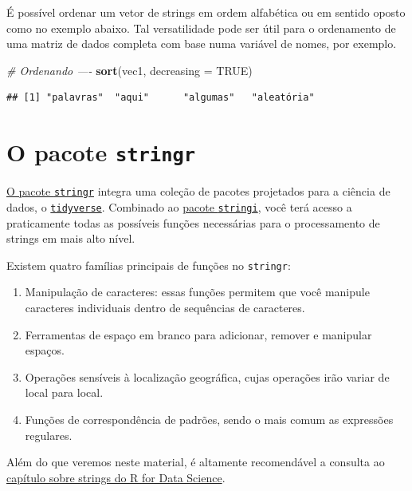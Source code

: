 \documentclass[]{book}
\newenvironment{Shaded}{\begin{snugshade}}{\end{snugshade}}
\newcommand{\CommentTok}[1]{\textcolor[rgb]{0.56,0.35,0.01}{\textit{#1}}}
\newcommand{\DataTypeTok}[1]{\textcolor[rgb]{0.13,0.29,0.53}{#1}}
\newcommand{\KeywordTok}[1]{\textcolor[rgb]{0.13,0.29,0.53}{\textbf{#1}}}
\newcommand{\NormalTok}[1]{#1}
\newcommand{\OtherTok}[1]{\textcolor[rgb]{0.56,0.35,0.01}{#1}}
\begin{document}
É possível ordenar um vetor de strings em ordem alfabética ou em sentido oposto como no exemplo abaixo. Tal versatilidade pode ser útil para o ordenamento de uma matriz de dados completa com base numa variável de nomes, por exemplo.

\begin{Shaded}
\begin{Highlighting}[]
\CommentTok{# Ordenando ----}
\KeywordTok{sort}\NormalTok{(vec1, }\DataTypeTok{decreasing =} \OtherTok{TRUE}\NormalTok{)}
\end{Highlighting}
\end{Shaded}

\begin{verbatim}
## [1] "palavras"  "aqui"      "algumas"   "aleatória"
\end{verbatim}

\hypertarget{o-pacote-stringr}{%
\section{\texorpdfstring{O pacote \texttt{stringr}}{O pacote stringr}}\label{o-pacote-stringr}}

\href{https://stringr.tidyverse.org/}{O pacote \texttt{stringr}} integra uma coleção de pacotes projetados para a ciência de dados, o \href{https://www.tidyverse.org/}{\texttt{tidyverse}}. Combinado ao \href{https://cran.r-project.org/web/packages/stringi/index.html}{pacote \texttt{stringi}}, você terá acesso a praticamente todas as possíveis funções necessárias para o processamento de strings em mais alto nível.

Existem quatro famílias principais de funções no \texttt{stringr}:

\begin{enumerate}
\def\labelenumi{\arabic{enumi}.}
\item
  Manipulação de caracteres: essas funções permitem que você manipule caracteres individuais dentro de sequências de caracteres.
\item
  Ferramentas de espaço em branco para adicionar, remover e manipular espaços.
\item
  Operações sensíveis à localização geográfica, cujas operações irão variar de local para local.
\item
  Funções de correspondência de padrões, sendo o mais comum as expressões regulares.
\end{enumerate}

Além do que veremos neste material, é altamente recomendável a consulta ao \href{https://r4ds.had.co.nz/strings.html}{capítulo sobre strings do R for Data Science}.
\end{document}
